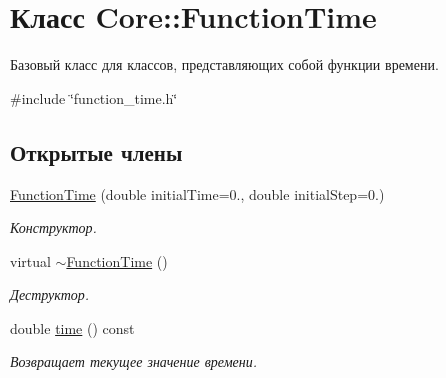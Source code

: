 \hypertarget{class_core_1_1_function_time}{}\section{Класс Core\+:\+:Function\+Time}
\label{class_core_1_1_function_time}


Базовый класс для классов, представляющих собой функции времени.  




{\ttfamily \#include \char`\"{}function\+\_\+time.\+h\char`\"{}}

\subsection*{Открытые члены}
\begin{DoxyCompactItemize}
\item 
\hypertarget{class_core_1_1_function_time_a7d2987678c02b38563cd21261884d679}{}\label{class_core_1_1_function_time_a7d2987678c02b38563cd21261884d679} 
\hyperlink{class_core_1_1_function_time_a7d2987678c02b38563cd21261884d679}{Function\+Time} (double initial\+Time=0., double initial\+Step=0.)
\begin{DoxyCompactList}\small\item\em Конструктор. \end{DoxyCompactList}\item 
\hypertarget{class_core_1_1_function_time_a35d2db55f45326b660b9831c6e9ac5c6}{}\label{class_core_1_1_function_time_a35d2db55f45326b660b9831c6e9ac5c6} 
virtual \hyperlink{class_core_1_1_function_time_a35d2db55f45326b660b9831c6e9ac5c6}{$\sim$\+Function\+Time} ()
\begin{DoxyCompactList}\small\item\em Деструктор. \end{DoxyCompactList}\item 
\hypertarget{class_core_1_1_function_time_abdba9d0552e571c23f28335e67cf7f41}{}\label{class_core_1_1_function_time_abdba9d0552e571c23f28335e67cf7f41} 
double \hyperlink{class_core_1_1_function_time_abdba9d0552e571c23f28335e67cf7f41}{time} () const
\begin{DoxyCompactList}\small\item\em Возвращает текущее значение времени. \end{DoxyCompactList}\item 
\hypertarget{class_core_1_1_function_time_a7c3dfc0d8d69c83c162c42435fa13cb9}{}\label{class_core_1_1_function_time_a7c3dfc0d8d69c83c162c42435fa13cb9} 

\end{DoxyCompactItemize}
